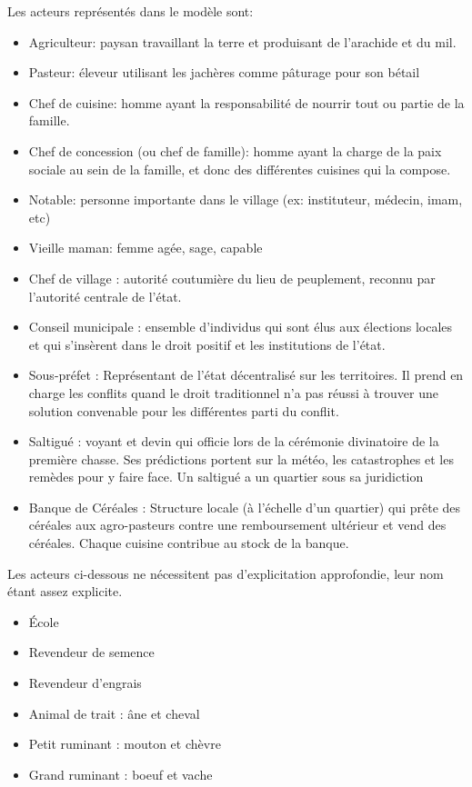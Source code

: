Les acteurs représentés dans le modèle sont:
\begin{itemize}
  \item Agriculteur: paysan travaillant la terre et produisant de l'arachide et du mil.
  \item Pasteur: éleveur utilisant les jachères comme pâturage pour son bétail
  \item Chef de cuisine: homme ayant la responsabilité de nourrir tout ou partie de la famille.
  \item Chef de concession (ou chef de famille): homme ayant la charge de la paix sociale au sein de la famille, et donc des différentes cuisines qui la compose.
  \item Notable: personne importante dans le village (ex: instituteur, médecin, imam, etc)
  \item Vieille maman:  femme agée, sage, capable
  \item Chef de village : autorité coutumière du lieu de peuplement, reconnu par l'autorité centrale de l'état.
  \item Conseil municipale : ensemble d'individus qui sont élus aux élections locales et qui s'insèrent dans le droit positif et les institutions de l'état.
  \item Sous-préfet : Représentant de l'état décentralisé sur les territoires. Il prend en charge les conflits quand le droit traditionnel n'a pas réussi à trouver une solution convenable pour les différentes parti du conflit.
  \item Saltigué : voyant et devin qui officie lors de la cérémonie divinatoire de la première chasse. Ses prédictions portent sur la météo, les catastrophes et les remèdes pour y faire face. Un saltigué a un quartier sous sa juridiction
  \item Banque de Céréales : Structure locale (à l'échelle d'un quartier) qui prête des céréales aux agro-pasteurs contre une remboursement ultérieur et vend des céréales. Chaque cuisine contribue au stock de la banque.
\end{itemize}

Les acteurs ci-dessous ne nécessitent pas d'explicitation approfondie, leur nom étant assez explicite.

\begin{itemize}
\item École
\item Revendeur de semence
\item Revendeur d'engrais
\item Animal de trait : âne et cheval
\item Petit ruminant : mouton et chèvre
\item Grand ruminant : boeuf et vache
\end{itemize}

